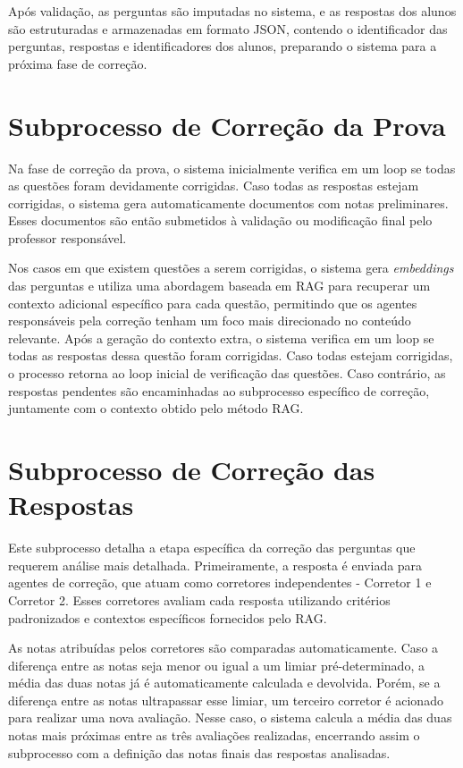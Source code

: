 Após validação, as perguntas são imputadas no sistema, e as respostas dos alunos são estruturadas e armazenadas em formato JSON, contendo o identificador das perguntas, respostas e identificadores dos alunos, preparando o sistema para a próxima fase de correção.


\section{Subprocesso de Correção da Prova}

Na fase de correção da prova, o sistema inicialmente verifica em um loop se todas as questões foram devidamente corrigidas. Caso todas as respostas estejam corrigidas, o sistema gera automaticamente documentos com notas preliminares. Esses documentos são então submetidos à validação ou modificação final pelo professor responsável.

Nos casos em que existem questões a serem corrigidas, o sistema gera \textit{embeddings} das perguntas e utiliza uma abordagem baseada em RAG para recuperar um contexto adicional específico para cada questão, permitindo que os agentes responsáveis pela correção tenham um foco mais direcionado no conteúdo relevante. Após a geração do contexto extra, o sistema verifica em um loop se todas as respostas dessa questão foram corrigidas. Caso todas estejam corrigidas, o processo retorna ao loop inicial de verificação das questões. Caso contrário, as respostas pendentes são encaminhadas ao subprocesso específico de correção, juntamente com o contexto obtido pelo método RAG.

\section{Subprocesso de Correção das Respostas}

Este subprocesso detalha a etapa específica da correção das perguntas que requerem análise mais detalhada. Primeiramente, a resposta é enviada para agentes de correção, que atuam como corretores independentes - Corretor 1 e Corretor 2. Esses corretores avaliam cada resposta utilizando critérios padronizados e contextos específicos fornecidos pelo RAG.

As notas atribuídas pelos corretores são comparadas automaticamente. Caso a diferença entre as notas seja menor ou igual a um limiar pré-determinado, a média das duas notas já é automaticamente calculada e devolvida. Porém, se a diferença entre as notas ultrapassar esse limiar, um terceiro corretor é acionado para realizar uma nova avaliação. Nesse caso, o sistema calcula a média das duas notas mais próximas entre as três avaliações realizadas, encerrando assim o subprocesso com a definição das notas finais das respostas analisadas.

